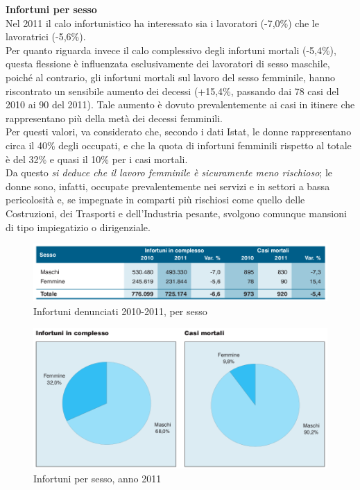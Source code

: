 \textbf{Infortuni per sesso}\\
Nel 2011 il calo infortunistico ha interessato sia i lavoratori (-7,0\%) che le lavoratrici (-5,6\%).\\
Per quanto riguarda invece il calo complessivo degli infortuni mortali (-5,4\%), questa flessione è influenzata esclusivamente dei lavoratori di sesso maschile, poiché al contrario, gli infortuni mortali sul lavoro del sesso femminile, hanno riscontrato un sensibile aumento dei decessi (+15,4\%, passando dai 78 casi del 2010 ai 90 del 2011). Tale aumento è dovuto prevalentemente ai casi in itinere che rappresentano più della metà dei decessi femminili.\\
Per questi valori, va considerato che, secondo i dati Istat, le donne rappresentano circa il 40\% degli occupati, e che la quota di infortuni femminili rispetto al totale è del 32\% e quasi il 10\% per i casi mortali.\\
Da questo \textit{si deduce che il lavoro femminile è sicuramente meno rischioso}; le donne sono, infatti, occupate prevalentemente nei servizi e in settori a bassa pericolosità e, se impegnate in comparti più rischiosi come quello delle Costruzioni, dei Trasporti e
dell'Industria pesante, svolgono comunque mansioni di tipo impiegatizio o dirigenziale.


\begin{figure}[H]
\centering
\includegraphics[scale=0.5]{images/cap4/analisiDiMercato/infortuniPerSesso1}
\caption{Infortuni denunciati 2010-2011, per sesso}
\end{figure}

\begin{figure}[H]
\centering
\includegraphics[scale=0.5]{images/cap4/analisiDiMercato/infortuniPerSesso2}
\caption{Infortuni per sesso, anno 2011}
\end{figure}

